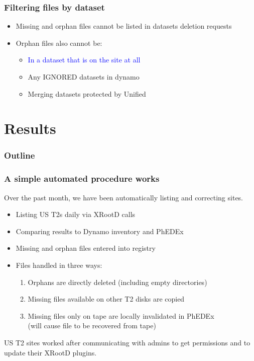 \documentclass{beamer}
\begin{document}
\begin{frame}
  \frametitle{Filtering files by dataset}

  \begin{itemize}
  \item Missing and orphan files cannot be listed in datasets deletion requests
  \item Orphan files also cannot be:
    \begin{itemize}
    \item \textcolor{blue}{In a dataset that is on the site at all}
    \item Any IGNORED datasets in dynamo
    \item Merging datasets protected by Unified
    \end{itemize}
  \end{itemize}

\end{frame}

\section{Results}

\begin{frame}
  \frametitle{Outline}
  \tableofcontents[currentsection]
\end{frame}

\begin{frame}
  \frametitle{A simple automated procedure works}

  Over the past month,
  we have been automatically listing and correcting sites.

  \begin{itemize}
  \item Listing US T2s daily via XRootD calls
  \item Comparing results to Dynamo inventory and PhEDEx
  \item Missing and orphan files entered into registry
  \item Files handled in three ways:
    \begin{enumerate}
    \item Orphans are directly deleted (including empty directories)
    \item Missing files available on other T2 disks are copied
    \item Missing files only on tape are locally invalidated in PhEDEx \\
      (will cause file to be recovered from tape)
    \end{enumerate}
  \end{itemize}

  US T2 sites worked after communicating with admins
  to get permissions and to update their XRootD plugins.

\end{frame}
\end{document}
